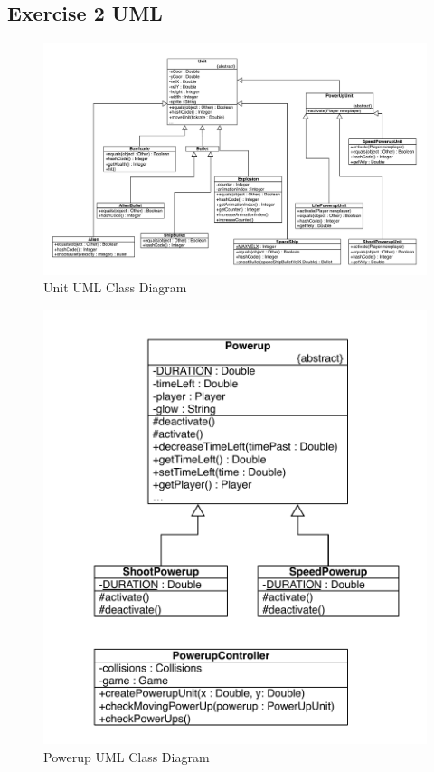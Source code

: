 \subsection*{Exercise 2 UML} 
\begin{figure}[ht!]
\centering
\includegraphics[width=15cm]{SI-UMLpowerupHierarchy1.pdf}
\caption{Unit UML Class Diagram}
\end{figure}
\begin{figure}[ht!]
\centering
\includegraphics[width=12cm]{SI-UMLpowerupHierarchy2.pdf}
\caption{Powerup UML Class Diagram}
\end{figure}
\clearpage
